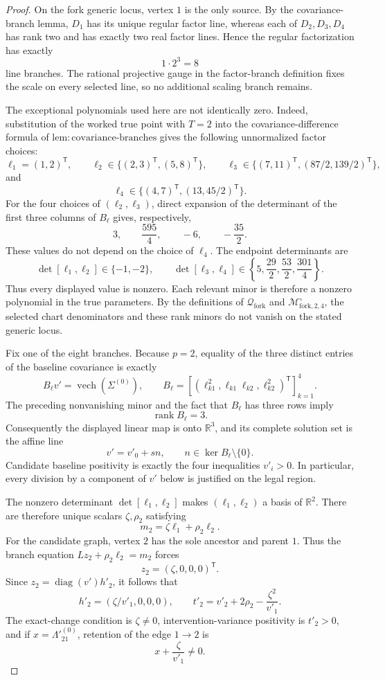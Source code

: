 \documentclass{article}
\begin{document}
\begin{proof}
On the fork generic locus, vertex \(1\) is the only source. By the covariance-branch lemma, \(D_1\) has its unique regular factor line, whereas each of \(D_2,D_3,D_4\) has rank two and has exactly two real factor lines. Hence the regular factorization has exactly
\[
 1\cdot 2^3=8
\]
line branches. The rational projective gauge in the factor-branch definition fixes the scale on every selected line, so no additional scaling branch remains.

The exceptional polynomials used here are not identically zero. Indeed, substitution of the worked true point with \(T=2\) into the covariance-difference formula of \(\mathrm{lem:covariance\text{-}branches}\) gives the following unnormalized factor choices:
\[
 \ell_1=(1,2)^{\mathsf T},\qquad
 \ell_2\in\{(2,3)^{\mathsf T},(5,8)^{\mathsf T}\},\qquad
 \ell_3\in\{(7,11)^{\mathsf T},(87/2,139/2)^{\mathsf T}\},
\]
and
\[
 \ell_4\in\{(4,7)^{\mathsf T},(13,45/2)^{\mathsf T}\}.
\]
For the four choices of \((\ell_2,\ell_3)\), direct expansion of the determinant of the first three columns of \(B_{\ell}\) gives, respectively,
\[
 3,\qquad \frac{595}{4},\qquad -6,\qquad -\frac{35}{2}.
\]
These values do not depend on the choice of \(\ell_4\). The endpoint determinants are
\[
 \det[\ell_1,\ell_2]\in\{-1,-2\},\qquad
 \det[\ell_3,\ell_4]
 \in\left\{5,\frac{29}{2},\frac{53}{2},\frac{301}{4}\right\}.
\]
Thus every displayed value is nonzero. Each relevant minor is therefore a nonzero polynomial in the true parameters. By the definitions of \(\mathcal Q_{\mathrm{fork}}\) and \(\mathcal M^{\circ}_{\mathrm{fork},2,4}\), the selected chart denominators and these rank minors do not vanish on the stated generic locus.

Fix one of the eight branches. Because \(p=2\), equality of the three distinct entries of the baseline covariance is exactly
\[
 B_{\ell}v'=\operatorname{vech}(\Sigma^{(0)}),\qquad
 B_{\ell}
 =\left[
   (\ell_{k1}^{2},\ell_{k1}\ell_{k2},\ell_{k2}^{2})^{\mathsf T}
  \right]_{k=1}^{4}.
\]
The preceding nonvanishing minor and the fact that \(B_{\ell}\) has three rows imply
\[
 \operatorname{rank}B_{\ell}=3.
\]
Consequently the displayed linear map is onto \(\mathbb R^3\), and its complete solution set is the affine line
\[
 v'=v'_0+s n,\qquad n\in\ker B_{\ell}\setminus\{0\}.
\]
Candidate baseline positivity is exactly the four inequalities \(v'_i>0\). In particular, every division by a component of \(v'\) below is justified on the legal region.

The nonzero determinant \(\det[\ell_1,\ell_2]\) makes \((\ell_1,\ell_2)\) a basis of \(\mathbb R^2\). There are therefore unique scalars \(\zeta,\rho_2\) satisfying
\[
 m_2=\zeta\ell_1+\rho_2\ell_2.
\]
For the candidate graph, vertex \(2\) has the sole ancestor and parent \(1\). Thus the branch equation \(Lz_2+\rho_2\ell_2=m_2\) forces
\[
 z_2=(\zeta,0,0,0)^{\mathsf T}.
\]
Since \(z_2=\operatorname{diag}(v')h'_2\), it follows that
\[
 h'_2=(\zeta/v'_1,0,0,0),\qquad
 t'_2=v'_2+2\rho_2-\frac{\zeta^2}{v'_1}.
\]
The exact-change condition is \(\zeta\ne0\), intervention-variance positivity is \(t'_2>0\), and if \(x=\Lambda'^{(0)}_{21}\), retention of the edge \(1\to2\) is
\[
 x+\frac{\zeta}{v'_1}\ne0.
\]


\end{proof}
\end{document}
